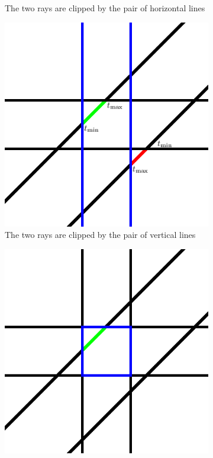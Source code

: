 \documentclass{article}
\begin{document}
\begin{figure}[h]
\begin{subfigure}[t]{0.21\linewidth}
		\caption{The two rays are clipped by the pair of horizontal lines}
		\label{fig:aabb2}
	\end{subfigure}
\hfill
	\begin{subfigure}[t]{0.21\linewidth}
		\includegraphics[width=\linewidth]{aabb3}
		\caption{The two rays are clipped by the pair of vertical lines}
		\label{fig:aabb3}
	\end{subfigure}
\hfill
	\begin{subfigure}[t]{0.21\linewidth}
		\includegraphics[width=\linewidth]{aabb4}

\end{subfigure}
\end{figure}
\end{document}
